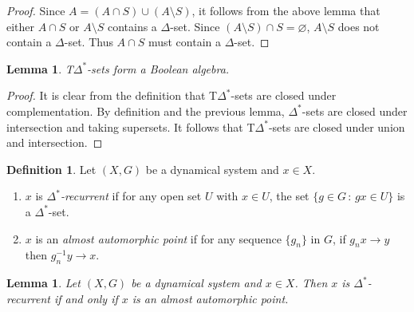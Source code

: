 \documentclass[11pt]{amsart}
\newtheorem{lemma}[theorem]{Lemma}
\theoremstyle{definition}
\newtheorem{definition}[theorem]{Definition}
\numberwithin{equation}{section}
\theoremstyle{definition}
\begin{document}
\begin{proof} Since $A=(A\cap S)\cup (A\setminus S)$, it follows from the above lemma that either $A\cap S$ or $A\setminus S$ contains a $\Delta$-set. Since $(A\setminus S)\cap S=\varnothing$, $A\setminus S$ does not contain a $\Delta$-set. Thus $A\cap S$ must contain a $\Delta$-set.
\end{proof}


\begin{lemma} T$\Delta^*$-sets form a Boolean algebra.
\end{lemma}
\begin{proof} It is clear from the definition that T$\Delta^*$-sets are closed under complementation. By definition and the previous lemma, $\Delta^*$-sets are closed under intersection and taking supersets. It follows that T$\Delta^*$-sets are closed under union and intersection.
\end{proof}

\begin{definition} Let $(X, G)$ be a dynamical system and $x\in X$.
\begin{enumerate}
\item $x$ is {\em $\Delta^*$-recurrent} if for any open set $U$ with $x\in U$, the set $\{g\in G\,:\, gx\in U\}$ is a $\Delta^*$-set.
\item $x$ is an {\em almost automorphic point} if for any sequence $\{g_n\}$ in $G$, if $g_nx\to y$ then $g_n^{-1}y\to x$.
\end{enumerate}
\end{definition}

\begin{lemma}\label{lem:3.7} Let $(X, G)$ be a dynamical system and $x\in X$. Then $x$ is $\Delta^*$-recurrent
if and only if $x$ is an almost automorphic point.
\end{lemma}
\end{document}
